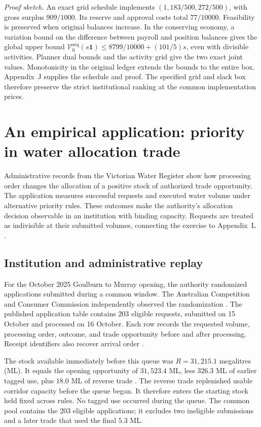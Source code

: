 \documentclass[ecta,draft]{econsocart}
\theoremstyle{definition}
\theoremstyle{definition}
\begin{document}
\noindent\emph{Proof sketch.}
An exact grid schedule implements $(1,183/500,272/500)$, with gross
surplus $909/1000$. Its reserve and approval costs total $77/10000$.
Feasibility is preserved when original balances increase. In the
conserving economy, a variation bound on the difference between payroll
and position balances gives the global upper bound
$\mathcal V^{\mathrm{seq}}_0(s\mathbf 1)
\leq8799/10000+(101/5)s$, even with divisible activities.
Planner dual bounds and the activity grid give the two exact joint
values. Monotonicity in the original ledger extends the bounds to
the entire box. Appendix~J%
 supplies the
schedule and proof. The specified grid and slack box therefore preserve the strict
institutional ranking at the common implementation prices.

\section{An empirical application: priority in water allocation trade}
\label{sec:waterapplication}

Administrative records from the Victorian Water Register show how processing
order changes the allocation of a positive stock of authorized trade
opportunity. The application measures successful requests and executed water
volume under alternative priority rules. These outcomes make the authority's
allocation decision observable in an institution with binding capacity.
Requests are treated as indivisible at their submitted volumes, connecting
the exercise to Appendix~L%
.

\subsection{Institution and administrative replay}
For the October 2025 Goulburn to Murray opening, the authority randomized
applications submitted during a common window. The Australian Competition
and Consumer Commission independently observed the randomization
\citep{ACCC2025October}. The published application table contains 203 eligible
requests, submitted on 15 October and processed on 16 October. Each row
records the requested volume, processing order, outcome, and trade opportunity
before and after processing. Receipt identifiers also recover arrival order
\citep[Table~5 and notes]{DEECA2025October}.

The stock available immediately before this queue was
$R=31{,}215.1$ megalitres (ML). It equals the opening opportunity of
$31{,}523.4$ ML, less $326.3$ ML of earlier tagged use, plus $18.0$ ML of
reverse trade \citep{DEECA2025October}. The reverse trade replenished usable
corridor capacity before the queue began. It therefore enters the starting
stock held fixed across rules. No tagged use occurred during the queue.
The common pool contains the 203 eligible applications; it excludes two
ineligible submissions and a later trade that used the final $5.3$ ML.
\end{document}
